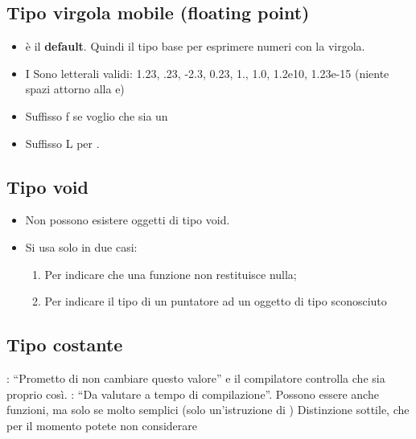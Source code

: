 \subsection{Tipo virgola mobile (floating point)}
\begin{itemize}
    \item {} è il \textbf{default}. Quindi il tipo base per esprimere numeri con la virgola.
    \item I Sono letterali validi: 1.23, .23, -2.3, 0.23, 1., 1.0, 1.2e10,
    1.23e-15 (niente spazi attorno alla e)
    \item Suffisso f se voglio che sia un 
    \item Suffisso L per .
\end{itemize}

\subsection{Tipo void}
\begin{itemize}
    \item  Non possono esistere oggetti di tipo void.
    
    \item Si usa solo in due casi:
        \begin{enumerate}
            \item Per indicare che una funzione non restituisce nulla;
            \item Per indicare il tipo di un puntatore ad un oggetto di tipo
            sconosciuto
        \end{enumerate}
\end{itemize}
\newpage
\subsection{Tipo costante}
\textbf{\textcolor{blue}{}}: “Prometto di non cambiare questo valore” e il compilatore controlla che sia proprio così. \newline
\textbf{\textcolor{blue}{}}: “Da valutare a tempo di compilazione”.
Possono essere  anche funzioni, ma solo se
molto semplici (solo un’istruzione di )\newline
Distinzione sottile, che per il momento potete non
considerare

